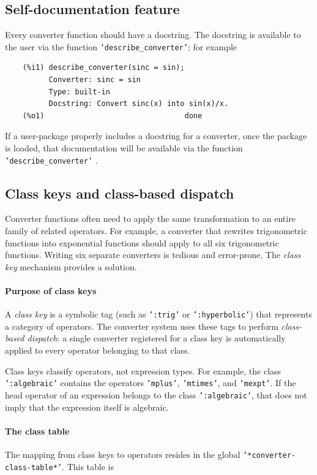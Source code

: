 \documentclass[12pt,fleqn]{extarticle}
\newcommand{\ttq}[1]{\texttt{'#1'}}
\newenvironment{maximabox}
  {\begin{tcolorbox}[
      breakable,
      enhanced,
      colback=white,
      colframe=black!8,
      boxrule=0pt,
      borderline west={2.2pt}{0pt}{black!25},
      arc=1pt,
      left=11pt,
      right=7pt,
      top=9pt,
      bottom=9pt,
      before skip=14pt,
      after skip=14pt
    ]}
  {\end{tcolorbox}}
\begin{document}
 
 \subsection{Self-documentation feature}
 
 Every converter function should have a docstring.  The docstring is available to the user
 via the function \ttq{describe\_converter}; for example
\begin{maximabox}
  \begin{verbatim}
    (%i1) describe_converter(sinc = sin);
          Converter: sinc = sin
          Type: built-in
          Docstring: Convert sinc(x) into sin(x)/x.
    (%o1)                                done
  \end{verbatim}
\end{maximabox}
If a user-package properly includes a docstring for a converter, once the package is loaded, that documentation will be available via the function \ttq{describe\_converter} .  


\subsection{Class keys and class-based dispatch}

Converter functions often need to apply the same transformation to an entire
family of related operators. For example, a converter that rewrites
trigonometric functions into exponential functions should apply to
all six trigonometric functions. Writing six separate converters is tedious and 
error-prone. The \emph{class key} mechanism provides a solution.

\paragraph{Purpose of class keys} A \emph{class key} is a symbolic tag (such as \ttq{:trig} or
\ttq{:hyperbolic}) that represents a category of operators. The converter
system uses these tags to perform \emph{class-based dispatch}: a single
converter registered for a class key is automatically applied to every
operator belonging to that class.

Class keys classify operators, not expression types. For example, the class
\ttq{:algebraic} contains the operators \ttq{mplus}, \ttq{mtimes}, and \ttq{mexpt}.
If the head operator of an expression belongs to the class \ttq{:algebraic}, that does not imply that the expression itself is algebraic.

\paragraph{The class table} The mapping from class keys to operators resides in the 
global \ttq{*converter-class-table*}. This table is 
\end{document}
